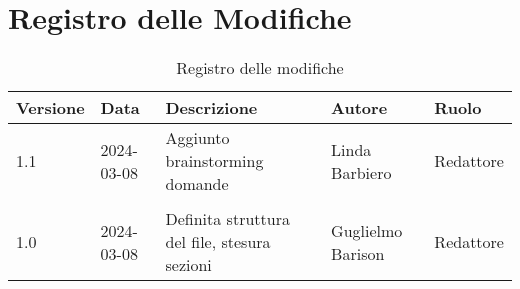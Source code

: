 \section{Registro delle Modifiche}
\begin{table}[ht!]	
		\centering
		\begin{tabular}{ p{1.2cm} p{2cm} p{6cm} p{3cm} p{2cm}}
			\toprule
			\textbf{Versione}& \textbf{Data} & \textbf{Descrizione} & \textbf{Autore} & \textbf{Ruolo} \\
			\midrule
			1.1 & 2024-03-08 & Aggiunto brainstorming domande & Linda Barbiero &
			Redattore \\\\ %
			1.0 & 2024-03-08 & Definita struttura del file, stesura sezioni & Guglielmo Barison & Redattore \\
			\bottomrule
		\end{tabular}
		\caption{Registro delle modifiche}
		\label{table:Registro delle modifiche}
\end{table}